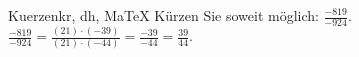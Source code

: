\begin{MAufgabe}{Kuerzen}{kr, dh, MaTeX}
K\"urzen Sie soweit m\"oglich: $\frac{-819}{-924}$.\\ 
\ifLsg\MLoesung
\quad $\frac{-819}{-924}=\frac{(21)\cdot(-39)}{(21)\cdot(-44)}=\frac{-39}{-44}=\frac{39}{44}$.\else\relax\fi
 \end{MAufgabe}
